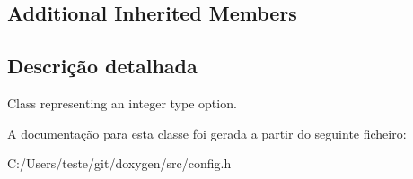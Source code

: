 \subsection*{Additional Inherited Members}


\subsection{Descrição detalhada}
Class representing an integer type option. 

A documentação para esta classe foi gerada a partir do seguinte ficheiro\-:\begin{DoxyCompactItemize}
\item 
C\-:/\-Users/teste/git/doxygen/src/config.\-h\end{DoxyCompactItemize}
